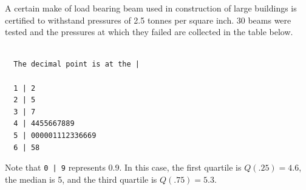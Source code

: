 \documentclass[addpoints]{examsetup}\usepackage[]{graphicx}\usepackage[]{color}
\makeatletter
\newenvironment{kframe}{%
 \def\at@end@of@kframe{}%
 \ifinner\ifhmode%
  \def\at@end@of@kframe{\end{minipage}}%
  \begin{minipage}{\columnwidth}%
 \fi\fi%
 \def\FrameCommand##1{\hskip\@totalleftmargin \hskip-\fboxsep
 \colorbox{shadecolor}{##1}\hskip-\fboxsep
     \hskip-\linewidth \hskip-\@totalleftmargin \hskip\columnwidth}%
 \MakeFramed {\advance\hsize-\width
   \@totalleftmargin\z@ \linewidth\hsize
   \@setminipage}}%
 {\par\unskip\endMakeFramed%
 \at@end@of@kframe}
\newenvironment{knitrout}{}{} %
\makeatother
\begin{document}
\begin{questions}
\question 



A certain make of load bearing beam used in construction of large buildings is certified to withstand pressures of 2.5 tonnes per square inch.
30 beams were tested and the pressures at which they failed are collected in the table below.

\begin{knitrout}
\color{fgcolor}\begin{kframe}
\begin{verbatim}

  The decimal point is at the |

  1 | 2
  2 | 5
  3 | 7
  4 | 4455667889
  5 | 000001112336669
  6 | 58
\end{verbatim}
\end{kframe}
\end{knitrout}

Note that \verb!0 | 9! represents 0.9. In this case, the first quartile is $Q(.25) = 4.6$, 
the median is 5, and the third quartile is $Q(.75) = 5.3$.

\end{questions}
\end{document}
